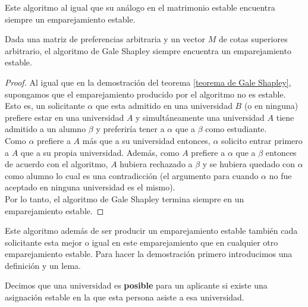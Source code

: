Este algoritmo al igual que su análogo en el matrimonio estable encuentra siempre un emparejamiento estable.
\begin{cor}
\label{gsu}
Dada una matriz de preferencias arbitraria y un vector $M$ de cotas superiores arbitrario, el algoritmo de Gale Shapley siempre encuentra un emparejamiento estable.
\end{cor}
\begin{proof}
Al igual que en la demostración del teorema \ref{teorema de Gale Shapley}, supongamos que el emparejamiento producido por el algoritmo no es estable. 
Esto es, un solicitante $\alpha$ que esta admitido en una universidad $B$ (o en ninguna) prefiere estar en una universidad $A$ y simultáneamente una universidad $A$ tiene admitido a un alumno $\beta$ y preferiría tener a $\alpha$ que a $\beta$ como estudiante. \\
Como $\alpha$ prefiere a $A$ más que a su universidad entonces, $\alpha$ solicito entrar primero a $A$ que a su propia universidad. 
Además, como $A$ prefiere a $\alpha$ que a $\beta$ entonces de acuerdo con el algoritmo, $A$ hubiera rechazado a $\beta$ y se hubiera quedado con $\alpha$ como alumno lo cual es una contradicción (el argumento para cuando $\alpha$ no fue aceptado en ninguna universidad es el mismo). \\
Por lo tanto, el algoritmo de Gale Shapley termina siempre en un emparejamiento estable. 
\end{proof}

Este algoritmo además de ser producir un emparejamiento estable también cada solicitante esta mejor o igual en este emparejamiento que en cualquier otro emparejamiento estable. Para hacer la demostración primero introducimos una definición y un lema. 

\begin{dfn}{\cite{GaleShapley}}
\label{Posible}
Decimos que una universidad es \textbf{posible} para un aplicante si existe una asignación estable en la que esta persona asiste a esa universidad.
\end{dfn}

